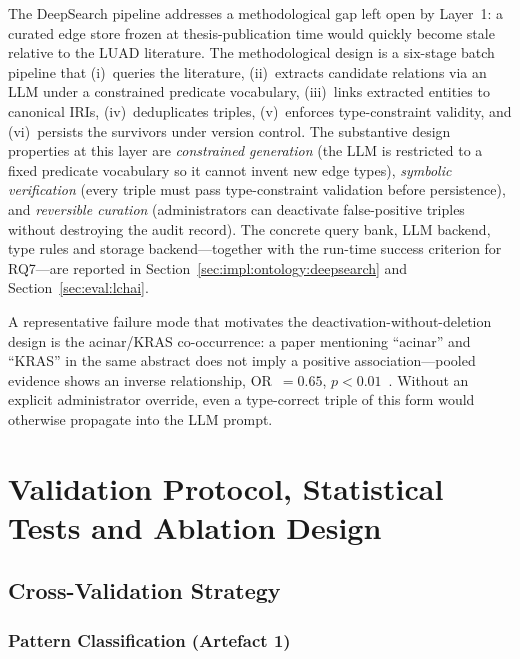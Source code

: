 The DeepSearch pipeline addresses a methodological gap left open by
Layer~1: a curated edge store frozen at thesis-publication time would
quickly become stale relative to the LUAD literature.
The methodological design is a six-stage batch pipeline that
(i)~queries the literature, (ii)~extracts candidate relations via an
LLM under a constrained predicate vocabulary, (iii)~links extracted
entities to canonical IRIs, (iv)~deduplicates triples,
(v)~enforces type-constraint validity, and (vi)~persists the survivors
under version control.
The substantive design properties at this layer are
\emph{constrained generation} (the LLM is restricted to a fixed
predicate vocabulary so it cannot invent new edge types),
\emph{symbolic verification} (every triple must pass type-constraint
validation before persistence), and \emph{reversible curation}
(administrators can deactivate false-positive triples without
destroying the audit record).
The concrete query bank, LLM backend, type rules and storage
backend---together with the run-time success criterion for RQ7---are
reported in Section~\ref{sec:impl:ontology:deepsearch} and
Section~\ref{sec:eval:lchai}.

A representative failure mode that motivates the
deactivation-without-deletion design is the
acinar/KRAS co-occurrence: a paper mentioning ``acinar'' and ``KRAS''
in the same abstract does not imply a positive association---pooled
evidence shows an inverse relationship,
OR~$= 0.65$, $p < 0.01$~\cite{ejso2019pooled}.
Without an explicit administrator override, even a type-correct triple
of this form would otherwise propagate into the LLM prompt.

\section{Validation Protocol, Statistical Tests and Ablation Design}
\label{sec:meth:evaluation_protocol}

\subsection{Cross-Validation Strategy}
\label{sec:meth:eval:cv}

\subsubsection{Pattern Classification (Artefact 1)}

